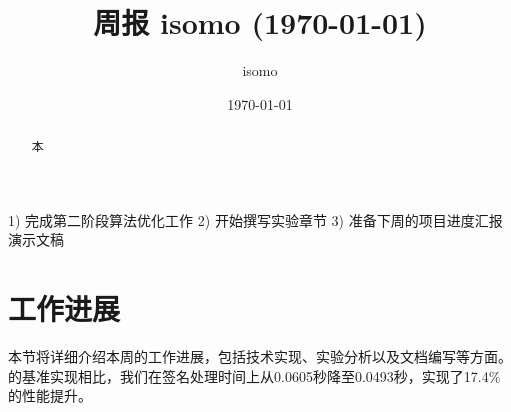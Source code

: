 \documentclass{article}
\title{周报 isomo (\today)}
\author{isomo}
\date{\today}
\begin{document}
\maketitle

\begin{abstract}
  本
\end{abstract}

\begin{weekplan}
1) 完成第二阶段算法优化工作 2) 开始撰写实验章节 3) 准备下周的项目进度汇报演示文稿
\end{weekplan}

\section{工作进展}

本节将详细介绍本周的工作进展，包括技术实现、实验分析以及文档编写等方面。\cite{Wang2025}的基准实现相比，我们在签名处理时间上从0.0605秒降至0.0493秒，实现了17.4\%的性能提升。

\end{document}
